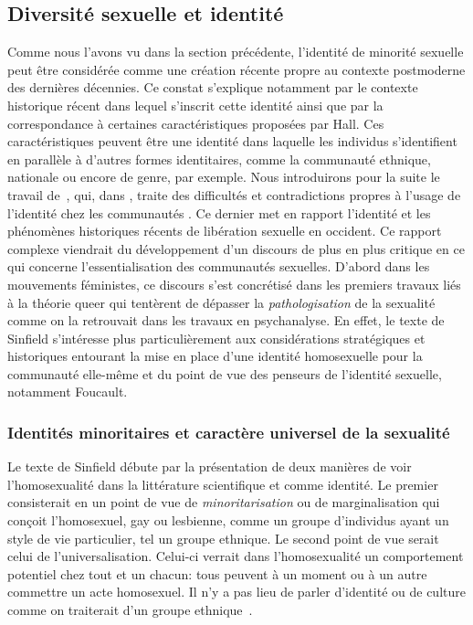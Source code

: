 \subsection{Diversité sexuelle et identité}
\label{sec:diversit_sexuelle_et_identit_} Comme nous l'avons vu dans la section précédente, l'identité de minorité sexuelle peut être considérée comme une création récente propre au contexte postmoderne des dernières décennies. 
Ce constat s'explique notamment par le contexte historique récent dans lequel s'inscrit cette identité ainsi que par la correspondance à certaines caractéristiques proposées par Hall. Ces caractéristiques peuvent être une identité dans laquelle les individus s'identifient en parallèle à d'autres formes identitaires, comme la communauté ethnique, nationale ou encore de genre, par exemple.
Nous introduirons pour la suite le travail de~\citet{Sinfield1996}, qui, dans , traite des difficultés et contradictions propres à l'usage de l'identité chez les communautés \lgbt{}.
Ce dernier met en rapport l'identité et les phénomènes historiques récents de libération sexuelle en occident.
Ce rapport complexe viendrait du développement d'un discours de plus en plus critique en ce qui concerne l'essentialisation des communautés sexuelles.
D'abord dans les mouvements féministes, ce discours s'est concrétisé dans les premiers travaux liés à la théorie queer qui tentèrent de dépasser la \emph{pathologisation} de la sexualité comme on la retrouvait dans les travaux en psychanalyse. 
En effet, le texte de Sinfield s'intéresse plus particulièrement aux considérations stratégiques et historiques entourant la mise en place d'une identité homosexuelle pour la communauté elle-même et du point de vue des penseurs de l'identité sexuelle, notamment Foucault.

\subsubsection{Identités minoritaires et caractère universel de la sexualité}
\label{sub:minorit_s_et_universel}
Le texte de Sinfield débute par la présentation de deux manières de voir l'homosexualité dans la littérature scientifique et comme identité.
Le premier consisterait en un point de vue de \emph{minoritarisation} ou de marginalisation qui conçoit l'homosexuel, gay ou lesbienne, comme un groupe d'individus ayant un style de vie particulier, tel un groupe ethnique.
Le second point de vue serait celui de l'universalisation. 
Celui-ci verrait dans l'homosexualité un comportement potentiel chez tout et un chacun: tous peuvent à un moment ou à un autre commettre un acte homosexuel. 
Il n'y a pas lieu de parler d'identité ou de culture comme on traiterait d'un groupe ethnique~\citep[271]{Sinfield1996}.

